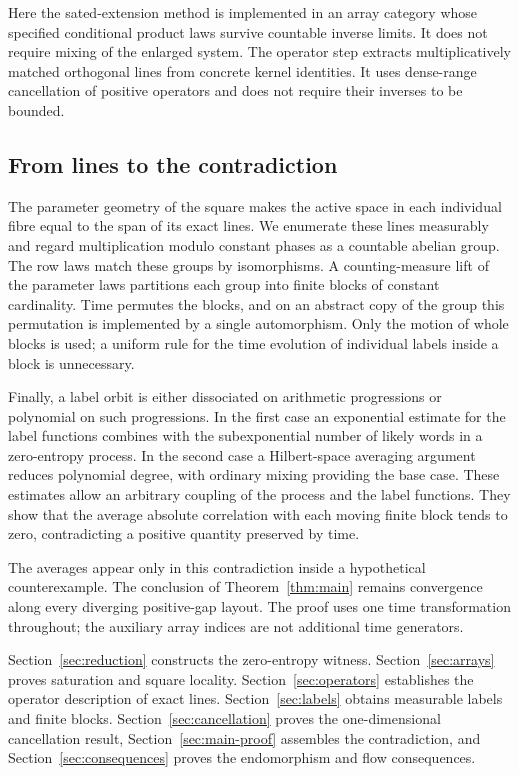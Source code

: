 Here the sated-extension method is implemented in an array category
whose specified conditional product laws survive countable inverse
limits. It does not require mixing of the enlarged system. The operator step
extracts multiplicatively matched orthogonal lines from concrete kernel
identities. It uses dense-range cancellation of positive operators and
does not require their inverses to be bounded.

\subsection*{From lines to the contradiction}

The parameter geometry of the square makes the active space in each
individual fibre equal to the span of its exact lines. We enumerate these
lines measurably and regard multiplication modulo constant phases as a
countable abelian group. The row laws match these groups by isomorphisms.
A counting-measure lift of the parameter laws partitions each group into
finite blocks of constant cardinality. Time permutes the blocks, and on
an abstract copy of the group this permutation is implemented by a single
automorphism. Only the motion of whole blocks is used; a uniform rule for
the time evolution of individual labels inside a block is unnecessary.

Finally, a label orbit is either dissociated on arithmetic progressions
or polynomial on such progressions. In the first case an exponential
estimate for the label functions combines with the subexponential number
of likely words in a zero-entropy process. In the second case a Hilbert-space
averaging argument reduces polynomial degree, with ordinary mixing providing
the base case. These estimates allow an arbitrary coupling of the process
and the label functions. They show that the average absolute correlation
with each moving finite block tends to zero, contradicting a positive
quantity preserved by time.

The averages appear only in this contradiction inside a hypothetical
counterexample. The conclusion of Theorem~\ref{thm:main} remains convergence
along every diverging positive-gap layout. The proof uses one time
transformation throughout; the auxiliary array indices are not additional
time generators.

Section~\ref{sec:reduction} constructs the zero-entropy witness.
Section~\ref{sec:arrays} proves saturation and square locality.
Section~\ref{sec:operators} establishes the operator description of exact
lines. Section~\ref{sec:labels} obtains measurable labels and finite blocks.
Section~\ref{sec:cancellation} proves the one-dimensional cancellation
result, Section~\ref{sec:main-proof} assembles the contradiction, and
Section~\ref{sec:consequences} proves the endomorphism and flow consequences.

